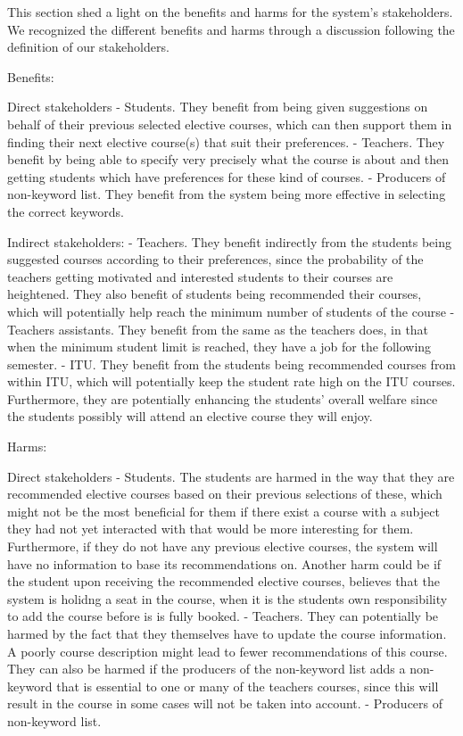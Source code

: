 This section shed a light on the benefits and harms for the system's stakeholders.
We recognized the different benefits and harms through a discussion following the definition of our stakeholders.

Benefits:

Direct stakeholders
- Students. They benefit from being given suggestions on behalf of their previous selected elective courses, which can then support them in finding their next elective course(s) that suit their preferences.
- Teachers. They benefit by being able to specify very precisely what the course is about and then getting students which have preferences for these kind of courses.
- Producers of non-keyword list. They benefit from the system being more effective in selecting the correct keywords.

Indirect stakeholders:
- Teachers. They benefit indirectly from the students being suggested courses according to their preferences, since the probability of the teachers getting motivated and interested students to their courses are heightened. They also benefit of students being recommended their courses, which will potentially help reach the minimum number of students of the course
- Teachers assistants. They benefit from the same as the teachers does, in that when the minimum student limit is reached, they have a job for the following semester.
- ITU. They benefit from the students being recommended courses from within ITU, which will potentially keep the student rate high on the ITU courses. Furthermore, they are potentially enhancing the students' overall welfare since the students possibly will attend an elective course they will enjoy.


Harms:

Direct stakeholders
- Students. The students are harmed in the way that they are recommended elective courses based on their previous selections of these, which might not be the most beneficial for them if there exist a course with a subject they had not yet interacted with that would be more interesting for them.
Furthermore, if they do not have any previous elective courses, the system will have no information to base its recommendations on.
Another harm could be if the student upon receiving the recommended elective courses, believes that the system is holidng a seat in the course, when it is the students own responsibility to add the course before is is fully booked.
- Teachers. They can potentially be harmed by the fact that they themselves have to update the course information. A poorly course description might lead to fewer recommendations of this course.
They can also be harmed if the producers of the non-keyword list adds a non-keyword that is essential to one or many of the teachers courses, since this will result in the course in some cases will not be taken into account.
- Producers of non-keyword list. 


